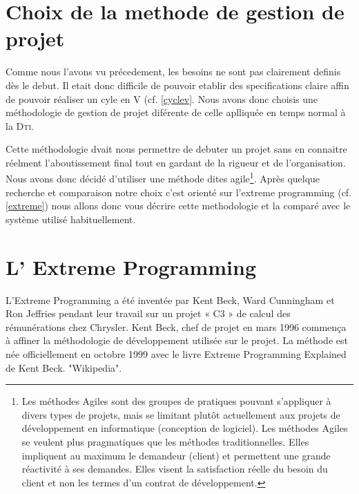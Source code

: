 
\section{Choix de la methode de gestion de projet}
Comme nous l'avons vu précedement, les besoins ne sont pas clairement definis dès le debut. Il etait donc difficile de pouvoir etablir des specifications claire affin de pouvoir réaliser un cyle en V (cf. \vref{cyclev}. Nous avons donc choisis une méthodologie de gestion de projet diférente de celle aplliquée en temps normal à la \textsc{Dti}.

Cette méthodologie dvait nous permettre de debuter un projet sans en connaitre réelment l'aboutissement final tout en gardant de la rigueur et de l'organisation. Nous avons donc décidé d'utiliser une méthode dites agile\footnote{Les méthodes Agiles sont des groupes de pratiques pouvant s'appliquer à divers types de projets, mais se limitant plutôt actuellement aux projets de développement en informatique (conception de logiciel). Les méthodes Agiles se veulent plus pragmatiques que les méthodes traditionnelles. Elles impliquent au maximum le demandeur (client) et permettent une grande réactivité à ses demandes. Elles visent la satisfaction réelle du besoin du client et non les termes d'un contrat de développement. }. Après quelque recherche et comparaison notre choix c'est orienté sur l'extreme programming (cf. \vref{extreme}) nous allons donc vous décrire cette methodologie et la comparé avec le système utilisé habituellement.

\section{L' Extreme Programming\label{extreme}}
L'Extreme Programming a été inventée par Kent Beck, Ward Cunningham et Ron Jeffries pendant leur travail sur un projet « C3 » de calcul des rémunérations chez Chrysler. Kent Beck, chef de projet en mars 1996 commença à affiner la méthodologie de développement utilisée sur le projet. La méthode est née officiellement en octobre 1999 avec le livre Extreme Programming Explained de Kent Beck. "Wikipedia".


